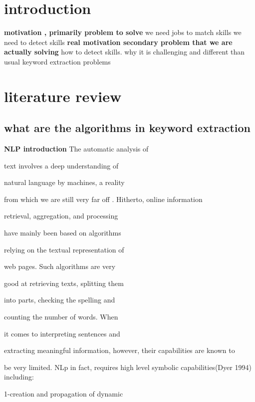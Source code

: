 \documentclass[11pt]{report}%
\begin{document}
\chapter{introduction}

\textbf{motivation , primarily problem to solve}\newline
we need jobs to match skills we need to detect skills\newline
\textbf{real motivation secondary problem that we are actually solving}\newline
how to detect skills. why it is challenging and different than usual keyword extraction problems 

\chapter{literature review}
\section{what are the algorithms in keyword extraction }
\textbf{NLP introduction} 
The automatic analysis of 

text involves a deep understanding of 

natural language by machines, a reality 

from which we are still very far off \cite{review on NLP}.
Hitherto, online information 

retrieval, aggregation, and processing 

have mainly been based on algorithms 

relying on the textual representation of 

web pages. Such algorithms are very 

good at retrieving texts, splitting them 

into parts, checking the spelling and 

counting the number of words. When 

it comes to interpreting sentences and 

extracting meaningful information, however, their capabilities are known to 

be very limited. NLp in fact, requires high level symbolic capabilities(Dyer 1994) including:

1-creation and propagation of dynamic 
\end{document}
